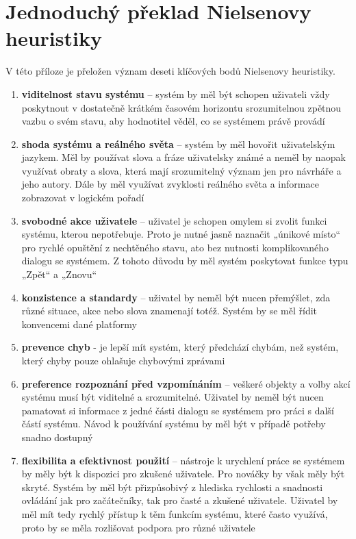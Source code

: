 \chapter{Jednoduchý překlad Nielsenovy heuristiky}
V této příloze je přeložen význam deseti klíčových bodů Nielsenovy heuristiky.
\begin{enumerate}
\item \textbf{viditelnost stavu systému} – systém by měl být schopen uživateli vždy poskytnout v dostatečně krátkém časovém horizontu srozumitelnou zpětnou vazbu o svém stavu, aby hodnotitel věděl, co se systémem právě provádí\cite{thesis:flamik} 

\item \textbf{shoda systému a reálného světa} – systém by měl hovořit uživatelským jazykem. Měl by používat slova a fráze uživatelsky známé a neměl by naopak využívat obraty a slova, která mají srozumitelný význam jen pro návrháře a jeho autory. Dále by měl využívat zvyklosti reálného světa a informace zobrazovat v logickém pořadí\cite{thesis:flamik} 

\item \textbf{svobodné akce uživatele} – uživatel je schopen omylem si zvolit funkci systému, kterou nepotřebuje. Proto je nutné jasně naznačit „únikové místo“ pro rychlé opuštění z nechtěného stavu, ato bez nutnosti komplikovaného dialogu se systémem. Z tohoto důvodu by měl systém poskytovat funkce typu „Zpět“ a „Znovu“\cite{thesis:flamik} 

\item \textbf{konzistence a standardy} – uživatel by neměl být nucen přemýšlet, zda různé situace, akce nebo slova znamenají totéž. Systém by se měl řídit konvencemi dané platformy\cite{thesis:flamik} 

\item \textbf{prevence chyb} - je lepší mít systém, který předchází chybám, než systém, který chyby pouze ohlašuje chybovými zprávami\cite{thesis:flamik} 

\item \textbf{preference rozpoznání před vzpomínáním} – veškeré objekty a volby akcí systému musí být viditelné a srozumitelné. Uživatel by neměl být nucen pamatovat si informace z jedné části dialogu se systémem pro práci s další částí systému. Návod k používání systému by měl být v případě potřeby snadno dostupný\cite{thesis:flamik} 

\item \textbf{flexibilita a efektivnost použití} – nástroje k urychlení práce se systémem by měly být k dispozici pro zkušené uživatele. Pro nováčky by však měly být skryté. Systém by měl být přizpůsobivý z hlediska rychlosti a snadnosti ovládání jak pro začátečníky, tak pro časté a zkušené uživatele. Uživatel by měl mít tedy rychlý přístup k těm funkcím systému, které často využívá, proto by se měla rozlišovat podpora pro různé uživatele\cite{thesis:flamik} 


\end{enumerate}
